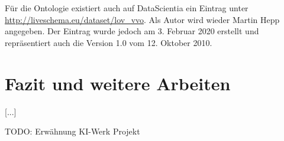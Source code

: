 \documentclass{article}
\begin{document}
Für die Ontologie existiert auch auf DataScientia ein Eintrag unter \url{http://liveschema.eu/dataset/lov\_vvo}.
Als Autor wird wieder Martin Hepp angegeben.
Der Eintrag wurde jedoch am 3. Februar 2020 erstellt und repräsentiert auch die Version 1.0 vom 12. Oktober 2010.


\section{Fazit und weitere Arbeiten}

[...]

TODO: Erwähnung KI-Werk Projekt



\medskip

\printbibliography
\end{document}
